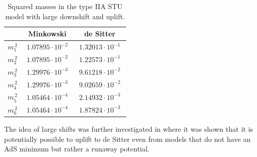 \documentclass[a4paper,12pt,twoside,openright]{report}
\begin{document}
\begin{table}[htb]
\centering
\begin{tabular}{|c|c|c|}\hline
&  Minkowski  & de Sitter \\\hline
$m_1^{\,2} $ & $\; 1.07895 \cdot 10^{-2} \;$ & $\; 1.32013 \cdot 10^{-1} \;$  \\\hline
$m_2^{\,2} $ & $\; 1.07895 \cdot 10^{-2} \;$ & $\; 1.22573 \cdot 10^{-1} \;$ \\\hline
$m_3^{\,2} $ & $\; 1.29976 \cdot 10^{-3} \;$ & $\; 9.61218 \cdot 10^{-2} \;$ \\\hline
$m_4^{\,2} $ & $\; 1.29976 \cdot 10^{-3} \;$ & $\; 9.02659 \cdot 10^{-2} \;$ \\\hline
$m_5^{\,2} $ & $\; 1.05464 \cdot 10^{-4} \;$ & $\; 2.14932 \cdot 10^{-3} \;$ \\\hline
$m_6^{\,2} $ & $\; 1.05464 \cdot 10^{-4} \;$ & $\; 1.87824 \cdot 10^{-3} \;$ \\\hline
\end{tabular}
\caption{  Squared masses in the type IIA STU model with large downshift and uplift. }
\label{tab:largemass}
\end{table}

The idea of large shifts was further investigated in \cite{Linde:2020mdk} where it was shown that it is potentially possible to uplift to de Sitter even from models that do not have an AdS minimum but rather a runaway potential. 
\end{document}

